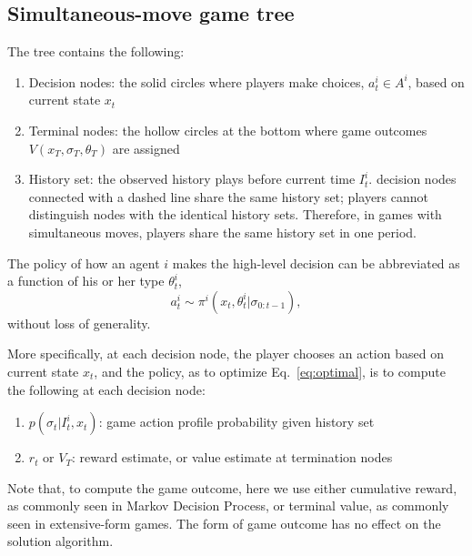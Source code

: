 \documentclass[letterpaper, 10 pt, conference]{ieeeconf}  %
\begin{document}
\subsection{Simultaneous-move game tree}
\vspace{-.2em}
The tree contains the following:
\begin{enumerate}
  \item Decision nodes: the solid circles where players make choices, 
    $a^i_t \in A^i$, based on current state $x_t$
  \item Terminal nodes: the hollow circles at the bottom where game outcomes 
    $V(x_T,\sigma_T,\theta_T)$ are assigned
  \item History set: the observed history plays before current time $I^i_t$. 
    decision nodes connected with a dashed line share the same history 
    set; players cannot distinguish nodes with the identical history sets. Therefore, in games with simultaneous moves, players share the same 
    history set in one period.  
\end{enumerate}

The policy of how an agent $i$ makes the high-level decision can be 
abbreviated as a function of his or her type $\theta^i_t$,
\begin{equation}
a^i_t \sim \pi^i(x_t,\theta^i_t|\sigma_{0:t-1}),
\end{equation}
without loss of generality.

More specifically, at each decision node, the player chooses an action based on current state $x_t$, and the policy, as to optimize Eq.~\ref{eq:optimal}, is to 
compute the following at each decision node:
\begin{enumerate}
  \item $p(\sigma_{t}|I^i_t,x_t)$: game action profile probability given history set
  \item $r_{t}$ or $V_T$: 
    reward estimate, or value estimate at termination nodes
\end{enumerate}
Note that, to compute the game outcome, here we use either cumulative reward, as 
commonly seen in Markov Decision Process, or terminal value, as commonly seen 
in extensive-form games. The form of game outcome has no effect on the 
solution algorithm.  
\end{document}
